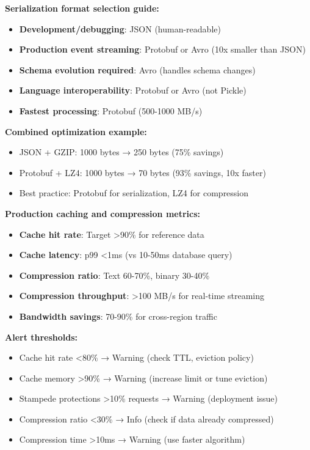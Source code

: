 \textbf{Serialization format selection guide:}
\begin{itemize}
    \item \textbf{Development/debugging}: JSON (human-readable)
    \item \textbf{Production event streaming}: Protobuf or Avro (10x smaller than JSON)
    \item \textbf{Schema evolution required}: Avro (handles schema changes)
    \item \textbf{Language interoperability}: Protobuf or Avro (not Pickle)
    \item \textbf{Fastest processing}: Protobuf (500-1000 MB/s)
\end{itemize}

\textbf{Combined optimization example:}
\begin{itemize}
    \item JSON + GZIP: 1000 bytes → 250 bytes (75\% savings)
    \item Protobuf + LZ4: 1000 bytes → 70 bytes (93\% savings, 10x faster)
    \item Best practice: Protobuf for serialization, LZ4 for compression
\end{itemize}

\textbf{Production caching and compression metrics:}
\begin{itemize}
    \item \textbf{Cache hit rate}: Target >90\% for reference data
    \item \textbf{Cache latency}: p99 <1ms (vs 10-50ms database query)
    \item \textbf{Compression ratio}: Text 60-70\%, binary 30-40\%
    \item \textbf{Compression throughput}: >100 MB/s for real-time streaming
    \item \textbf{Bandwidth savings}: 70-90\% for cross-region traffic
\end{itemize}

\textbf{Alert thresholds:}
\begin{itemize}
    \item Cache hit rate <80\% → Warning (check TTL, eviction policy)
    \item Cache memory >90\% → Warning (increase limit or tune eviction)
    \item Stampede protections >10\% requests → Warning (deployment issue)
    \item Compression ratio <30\% → Info (check if data already compressed)
    \item Compression time >10ms → Warning (use faster algorithm)
\end{itemize}

